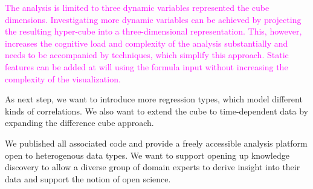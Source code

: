 \documentclass[journal]{style/vgtc} 			          %
\newcommand{\magenta}[1]{\textcolor{magenta}{#1}}
\begin{document}
\magenta{
The analysis is limited to three dynamic variables represented the cube dimensions.
Investigating more dynamic variables can be achieved by projecting the resulting hyper-cube into a three-dimensional representation.
This, however, increases the cognitive load and complexity of the analysis substantially and needs to be accompanied by techniques, which simplify this approach.
Static features can be added at will using the formula input without increasing the complexity of the visualization.
}

As next step, we want to introduce more regression types, which model different kinds of correlations.
We also want to extend the cube to time-dependent data by expanding the difference cube approach.

We published all associated code and provide a freely accessible analysis platform open to heterogenous data types.
We want to support opening up knowledge discovery to allow a diverse group of domain experts to derive insight into their data and support the notion of open science.
\begin{small}
\end{small}
\clearpage
\newpage


\end{document}
